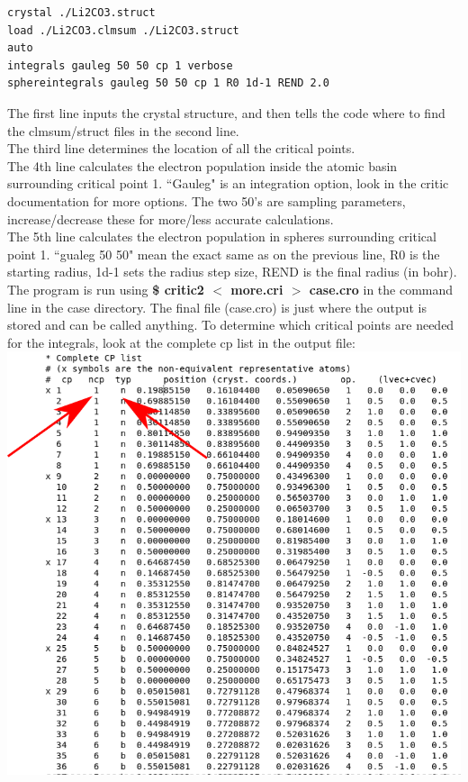 \documentclass[12pt]{article}
\begin{document}
\begin{lstlisting}
crystal ./Li2CO3.struct
load ./Li2CO3.clmsum ./Li2CO3.struct
auto
integrals gauleg 50 50 cp 1 verbose
sphereintegrals gauleg 50 50 cp 1 R0 1d-1 REND 2.0
\end{lstlisting}

The first line inputs the crystal structure, and then tells the code where to find the clmsum/struct files in the second line.  \\

The third line determines the location of all the critical points.  \\

The 4th line calculates the electron population inside the atomic basin surrounding critical point 1.  ``Gauleg" is an integration option, look in the critic documentation for more options.  The two 50's are sampling parameters, increase/decrease these for more/less accurate calculations.  \\

The 5th line calculates the electron population in spheres surrounding critical point 1. ``gualeg 50 50" mean the exact same as on the previous line, R0 is the starting radius, 1d-1 sets the radius step size, REND is the final radius (in bohr).\\

The program is run using \textbf{\$ critic2 $<$ more.cri $>$ case.cro} in the command line in the case directory.  The final file (case.cro) is just where the output is stored and can be called anything.  To determine which critical points are needed for the integrals, look at the complete cp list in the output file: \\

\includegraphics[scale=0.4]{./images/cro_cplist.png}\\
\end{document}
